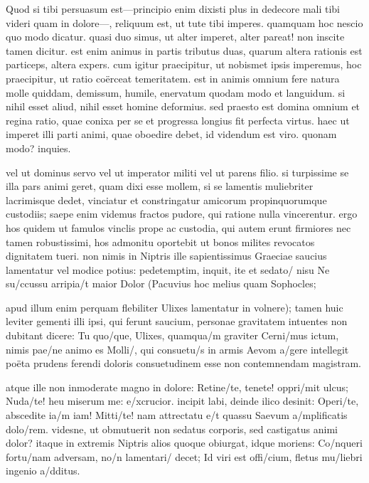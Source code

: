  Quod si tibi persuasum est—principio enim dixisti plus in dedecore mali tibi videri quam in dolore—, reliquum est, ut tute tibi imperes. quamquam hoc nescio quo modo dicatur. quasi duo simus, ut alter imperet, alter pareat! non inscite tamen dicitur. est enim animus in partis tributus duas, quarum altera rationis est particeps, altera expers. cum igitur praecipitur, ut nobismet ipsis imperemus, hoc praecipitur, ut ratio coërceat temeritatem. est in animis omnium fere natura molle quiddam, demissum, humile, enervatum quodam modo et languidum. si nihil esset aliud, nihil esset homine deformius. sed praesto est domina omnium et regina ratio, quae conixa per se et progressa longius fit perfecta virtus. haec ut imperet illi parti animi, quae oboedire debet, id videndum est viro. quonam modo? inquies.

 vel ut dominus servo vel ut imperator militi vel ut parens filio. si turpissime se illa pars animi geret, quam dixi esse mollem, si se lamentis muliebriter lacrimisque dedet, vinciatur et constringatur amicorum propinquorumque custodiis; saepe enim videmus fractos pudore, qui ratione nulla vincerentur. ergo hos quidem ut famulos vinclis prope ac custodia, qui autem erunt firmiores nec tamen robustissimi, hos admonitu oportebit ut bonos milites revocatos dignitatem tueri. non nimis in Niptris ille sapientissimus Graeciae saucius lamentatur vel modice potius: pedetemptim, inquit, ite et sedato/ nisu Ne su/ccussu arripia/t maior Dolor (Pacuvius hoc melius quam Sophocles;

 apud illum enim perquam flebiliter Ulixes lamentatur in volnere); tamen huic leviter gementi illi ipsi, qui ferunt saucium, personae gravitatem intuentes non dubitant dicere: Tu quo/que, Ulixes, quamqua/m graviter Cerni/mus ictum, nimis pae/ne animo es Molli/, qui consuetu/s in armis Aevom a/gere intellegit poëta prudens ferendi doloris consuetudinem esse non contemnendam magistram.

 atque ille non inmoderate magno in dolore: Retine/te, tenete! oppri/mit ulcus; Nuda/te! heu miserum me: e/xcrucior. incipit labi, deinde ilico desinit: Operi/te, abscedite ia/m iam! Mitti/te! nam attrectatu e/t quassu Saevum a/mplificatis dolo/rem. videsne, ut obmutuerit non sedatus corporis, sed castigatus animi dolor? itaque in extremis Niptris alios quoque obiurgat, idque moriens: Co/nqueri fortu/nam adversam, no/n lamentari/ decet; Id viri est offi/cium, fletus mu/liebri ingenio a/dditus.

